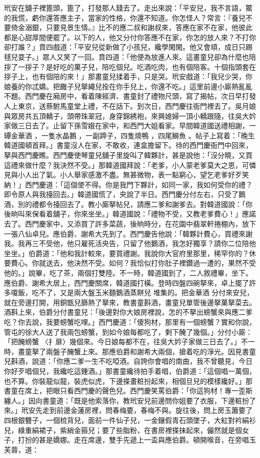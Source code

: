 玳安在舖子裡篦頭，篦了，打發那人錢去了。走出來說：「平安兒，我不言語，鱉的我慌，虧你還答應主子，當家的性格，你還不知道。你怎怪人？常言：『養兒不要倚金溺銀，只要見景生情。』比不的應二叔和謝叔來，答應在家不在家，他彼此都是心甜厚間便罷了。以下的人，他又分付你答應不在家，你怎的放人來？不打你卻打誰？」賁四戲道：「平安兒從新做了小孩兒，纔學閑閑。他又會頑，成日只踢毬兒耍子。」眾人又笑了一回。賁四道：「他便為放進人來。這畫童兒卻為什麼也陪拶了一拶子？是好吃的菓子兒，陪吃個兒。吃酒吃肉，也有個陪客。十個指頭套在拶子上，也有個陪的來！」那畫童兒揉着手，只是哭。玳安戲道：「我兒少哭，你娘養的你忒嬌。把饊子兒拏繩兒拴在你手兒上，你還不吃。」這里前邊小廝熱亂亂不題。西門慶在廂房中，看着陳經濟、書童封了禮物尺頭，寫了揭帖，次日早打發人上東京，送蔡駙馬童堂上禮，不在話下。到次日，西門慶往衙門裡去了。吳月娘與眾房共五頂轎子，頭帶珠翠冠，身穿錦綉袍，來興媳婦一頂小轎跟隨，往吳大妗家做三日去了。止留下孫雪娥在家中，和西門大姐看家。早間韓道國送禮相謝，一罈金華酒 ，一隻水晶鵝 ，一副蹄子，四隻燒鴨 ，四尾鰣魚 。帖子上寫着：「晚生韓道國頓首拜。」書童沒人在家，不敢收，連盒擔留下。待的西門慶衙門中回來，拏與西門慶瞧。西門慶使琴童兒舖子里旋叫了韓夥計，甚是說他：「沒分曉，又買這禮來做什麼？我決然不受。」那韓道國拜說：「老爹，小人蒙老爹莫大之恩，可憐見與小人出了氣。小人舉家感激不盡。無甚微物，表一點窮心，望乞老爹好歹笑納！」西門慶道：「這個使不得。你是我門下夥計，如同一家，我如何受你的禮？即令原人與我擡回去。」韓道國慌了，央說了半日。西門慶分付左右，只受了鵝酒，別的禮都令擡回去了。教小廝拏帖兒，請應二爹和謝爹去。對韓道國說：「你後晌叫來保看着舖子，你來坐坐。」韓道國說：「禮物不受，又教老爹費心！」應諾去了。西門慶家中，又添買了許多菜蔬，後晌時分，在花園中翡翠軒捲棚內，放下一張八仙卓兒。應伯爵、謝希大先到了。西門慶告他說：「韓夥計費心，買禮來謝我。我再三不受他，他只雇死活央告，只留了他鵝酒，我怎好獨享？請你二位陪他坐坐。」伯爵道：「他和我計較來，要買禮謝。我說你大官府里那里，稀罕你的？休要費心。你就送去，他決然不受。如何？我恰似打你肚子裡鑽過一遭的，果然不受他的。」說畢，吃了茶，兩個打雙陸。不一時，韓道國到了，二人敘禮畢，坐下。應伯爵、謝希大居上，西門慶關席，韓道國打橫。登時四盤四碗拏來，卓上擺了許多嗄飯，吃不了，又是兩大盤玉米麵鵝酒蒸餅兒 堆集的。把金華酒 分付來安兒，就在旁邊打開，用銅甑兒篩熱了拏來，教書童斟酒，畫童兒單管後邊拏菓拏菜去。酒斟上來，伯爵分付書童兒：「後邊對你大娘房裡說，怎的不拏出螃蟹來與應二爹吃？你去說，我要螃蟹吃哩。」西門慶道：「傻狗材，那里有一個螃蟹？實和你說，管屯的徐大人送了我兩包螃蟹，到如今娘每都吃了，剩下醃了幾個。」分付小廝：「把醃螃蟹 〈扌扉〉幾個來。今日娘每都不在，往吳大妗子家做三日去了。」不一時，畫童拏了兩盤子醃蟹上來。那應伯爵和謝希大兩個，搶着吃的淨光。因見書童兒斟酒，說道：「你應二爹一生不吃啞酒。自誇你會唱的南曲，我不曾聽見，今日你好歹唱個兒，我纔吃這鍾酒。」那書童纔待拍手着唱，伯爵道：「這個唱一萬個，也不算。你裝龍似龍，裝虎似虎，下邊搽畫粧扮起來，相個旦兒的模樣纔好。」那書童在席上，把眼只看西門慶的聲色兒。西門慶笑罵伯爵：「你這狗材！專一歪斯纏人。」因向書童道：「既是他索落你，教玳安兒前邊問你姐要了衣服，下邊粧扮了來。」玳安先走到前邊金蓮房裡，問春梅要，春梅不與。旋往後，問上房玉簫要了四根銀簪子，一個梳背兒，面前一件仙子兒，一金鑲假青石頭墜子，大紅對衿絹衫兒，綠重絹裙子，紫綃金箍兒；要了些脂粉，在書房裡搽抹起來，儼然就是個女子，打扮的甚是嬌娜。走在席邊，雙手先遞上一盃與應伯爵。頓開喉音，在旁唱玉芙蓉，道：

